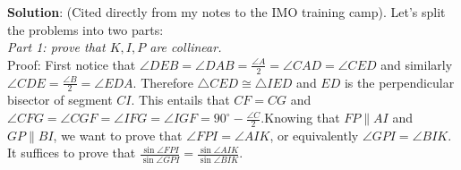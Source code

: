 \documentclass[11pt,a4paper]{article}
\begin{document}
\begin{enumerate}
	\textbf {Solution}: (Cited directly from my notes to the IMO training camp). Let's split the problems into two parts:
	\\ \emph{Part 1: prove that $K, I, P$ are collinear.}
	\\Proof: First notice that $\angle DEB=\angle DAB=\frac{\angle A}{2}=\angle CAD=\angle CED$ and similarly $\angle CDE=\frac{\angle B}{2}=\angle EDA$. Therefore $\triangle CED\cong\triangle IED$ and $ED$ is the perpendicular bisector of segment $CI$. This entails that $CF=CG$ and $\angle CFG=\angle CGF=\angle IFG=\angle IGF=90^{\circ}-\frac{\angle C}{2}.$Knowing that $FP\parallel AI$ and $GP\parallel BI$, we want to prove that $\angle FPI=\angle AIK$, or equivalently $\angle GPI=\angle BIK$. It suffices to prove that $\frac{\sin\angle FPI}{\sin\angle GPI}=\frac{\sin\angle AIK}{\sin\angle BIK}$.
	

\end{enumerate}
\end{document}
